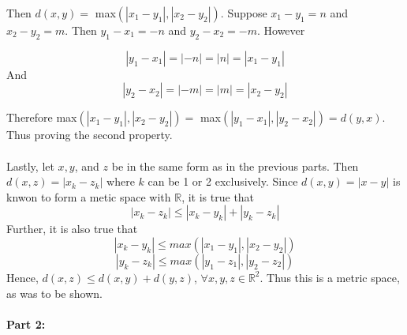 \documentclass[12pt, letterpaper]{article}
\begin{document}
\noindent Then $d(x, y) = $ max$(|x_1 - y_1|, |x_2 - y_2|)$. Suppose $x_1 - y_1 = n$ and $x_2 - y_2 = m$. Then $y_1 - x_1 = -n$ and $y_2 - x_2 = -m$.
However

$$ |y_1 - x_1| = |-n| = |n| = |x_1 - y_1|$$
And
$$|y_2 - x_2| = |-m| = |m| = |x_2 - y_2| $$

\noindent Therefore max$(|x_1 - y_1|, |x_2 - y_2|) = $ max$(|y_1 - x_1|, |y_2 - x_2|) = d(y, x)$. Thus proving the second property.\\
\\
\noindent Lastly, let $x, y$, and $z$ be in the same form as in the previous parts. Then $d(x, z) = |x_k - z_k|$ where $k$ can be 1 or 2 exclusively.
Since $d(x, y) = |x - y|$ is knwon to form a metic space with $\mathbb{R}$, it is true that
$$ |x_k - z_k| \leq |x_k - y_k| + |y_k - z_k| $$
\noindent Further, it is also true that
$$|x_k - y_k| \leq max(|x_1 - y_1|, |x_2 - y_2|)$$
$$|y_k - z_k| \leq max(|y_1 - z_1|, |y_2 - z_2|)$$
Hence, $d(x, z) \leq d(x, y) + d(y, z)$, $\forall x, y, z \in \mathbb{R}^2$. Thus this is a metric space, as was to be shown.\\
\\
\noindent\textbf{Part 2:}
\end{document}
